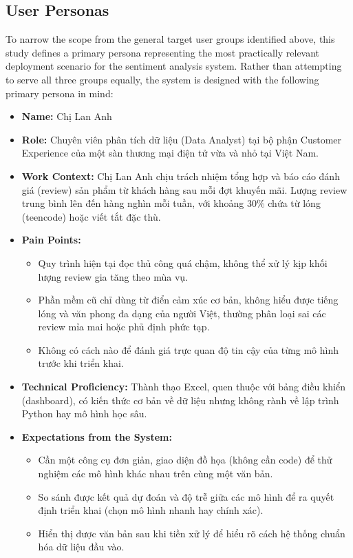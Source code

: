 \documentclass[12pt]{report} %
\begin{document}
\subsection{User Personas}
\label{subsec:user-personas}

To narrow the scope from the general target user groups identified above, this study defines a primary persona representing the most practically relevant deployment scenario for the sentiment analysis system. Rather than attempting to serve all three groups equally, the system is designed with the following primary persona in mind:

\begin{itemize}
    \item \textbf{Name:} Chị Lan Anh
    \item \textbf{Role:} Chuyên viên phân tích dữ liệu (Data Analyst) tại bộ phận Customer Experience của một sàn thương mại điện tử vừa và nhỏ tại Việt Nam.
    \item \textbf{Work Context:} Chị Lan Anh chịu trách nhiệm tổng hợp và báo cáo đánh giá (review) sản phẩm từ khách hàng sau mỗi đợt khuyến mãi. Lượng review trung bình lên đến hàng nghìn mỗi tuần, với khoảng 30\% chứa từ lóng (teencode) hoặc viết tắt đặc thù.
    \item \textbf{Pain Points:}
          \begin{itemize}
              \item Quy trình hiện tại đọc thủ công quá chậm, không thể xử lý kịp khối lượng review gia tăng theo mùa vụ.
              \item Phần mềm cũ chỉ dùng từ điển cảm xúc cơ bản, không hiểu được tiếng lóng và văn phong đa dạng của người Việt, thường phân loại sai các review mỉa mai hoặc phủ định phức tạp.
              \item Không có cách nào để đánh giá trực quan độ tin cậy của từng mô hình trước khi triển khai.
          \end{itemize}
    \item \textbf{Technical Proficiency:} Thành thạo Excel, quen thuộc với bảng điều khiển (dashboard), có kiến thức cơ bản về dữ liệu nhưng không rành về lập trình Python hay mô hình học sâu.
    \item \textbf{Expectations from the System:}
          \begin{itemize}
              \item Cần một công cụ đơn giản, giao diện đồ họa (không cần code) để thử nghiệm các mô hình khác nhau trên cùng một văn bản.
              \item So sánh được kết quả dự đoán và độ trễ giữa các mô hình để ra quyết định triển khai (chọn mô hình nhanh hay chính xác).
              \item Hiển thị được văn bản sau khi tiền xử lý để hiểu rõ cách hệ thống chuẩn hóa dữ liệu đầu vào.
          \end{itemize}
\end{itemize}
\end{document}

